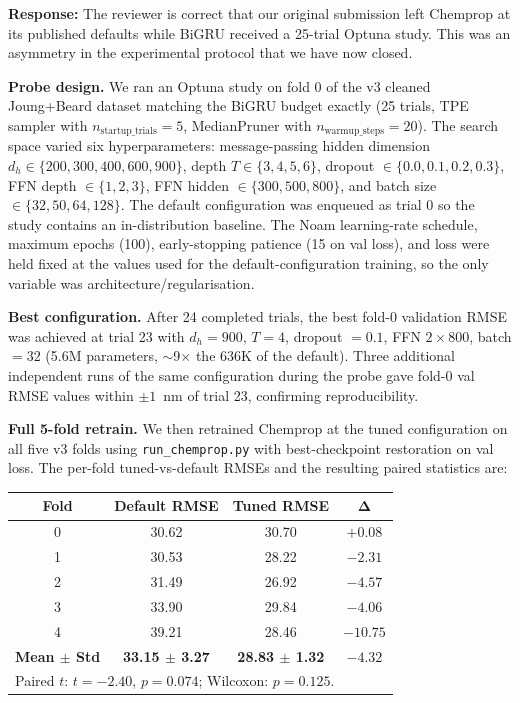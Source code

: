 \documentclass[11pt]{article}
\newcommand{\response}[1]{\noindent\textbf{Response:} #1\par\medskip}
\begin{document}
\response{The reviewer is correct that our original submission left Chemprop at its published defaults while BiGRU received a 25-trial Optuna study. This was an asymmetry in the experimental protocol that we have now closed.

\textbf{Probe design.} We ran an Optuna study on fold 0 of the v3 cleaned Joung+Beard dataset matching the BiGRU budget exactly (25 trials, TPE sampler with $n_{\text{startup\_trials}} = 5$, MedianPruner with $n_{\text{warmup\_steps}} = 20$). The search space varied six hyperparameters: message-passing hidden dimension $d_h \in \{200, 300, 400, 600, 900\}$, depth $T \in \{3, 4, 5, 6\}$, dropout $\in \{0.0, 0.1, 0.2, 0.3\}$, FFN depth $\in \{1, 2, 3\}$, FFN hidden $\in \{300, 500, 800\}$, and batch size $\in \{32, 50, 64, 128\}$. The default configuration was enqueued as trial 0 so the study contains an in-distribution baseline. The Noam learning-rate schedule, maximum epochs (100), early-stopping patience (15 on val loss), and loss were held fixed at the values used for the default-configuration training, so the only variable was architecture/regularisation.

\textbf{Best configuration.} After 24 completed trials, the best fold-0 validation RMSE was achieved at trial 23 with $d_h = 900$, $T = 4$, dropout $= 0.1$, FFN $2 \times 800$, batch $= 32$ (5.6M parameters, $\sim$9$\times$ the 636K of the default). Three additional independent runs of the same configuration during the probe gave fold-0 val RMSE values within $\pm 1$~nm of trial 23, confirming reproducibility.

\textbf{Full 5-fold retrain.} We then retrained Chemprop at the tuned configuration on all five v3 folds using \texttt{run\_chemprop.py} with best-checkpoint restoration on val loss. The per-fold tuned-vs-default RMSEs and the resulting paired statistics are:

\begin{center}\small
\begin{tabular}{cccc}
\toprule
\textbf{Fold} & \textbf{Default RMSE} & \textbf{Tuned RMSE} & $\boldsymbol{\Delta}$ \\
\midrule
0 & 30.62 & 30.70 & $+0.08$ \\
1 & 30.53 & 28.22 & $-2.31$ \\
2 & 31.49 & 26.92 & $-4.57$ \\
3 & 33.90 & 29.84 & $-4.06$ \\
4 & 39.21 & 28.46 & $-10.75$ \\
\midrule
\textbf{Mean $\pm$ Std} & \textbf{33.15 $\pm$ 3.27} & \textbf{28.83 $\pm$ 1.32} & \textbf{$-4.32$} \\
\bottomrule
\multicolumn{4}{l}{\footnotesize Paired $t$: $t = -2.40$, $p = 0.074$; Wilcoxon: $p = 0.125$.} \\
\end{tabular}
\end{center}

}
\end{document}
